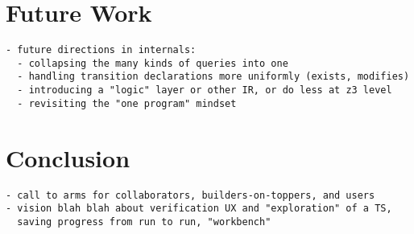 \section{Future Work}

\begin{verbatim}
- future directions in internals:
  - collapsing the many kinds of queries into one
  - handling transition declarations more uniformly (exists, modifies)
  - introducing a "logic" layer or other IR, or do less at z3 level
  - revisiting the "one program" mindset
\end{verbatim}

\section{Conclusion}

\begin{verbatim}
- call to arms for collaborators, builders-on-toppers, and users
- vision blah blah about verification UX and "exploration" of a TS,
  saving progress from run to run, "workbench"
\end{verbatim}